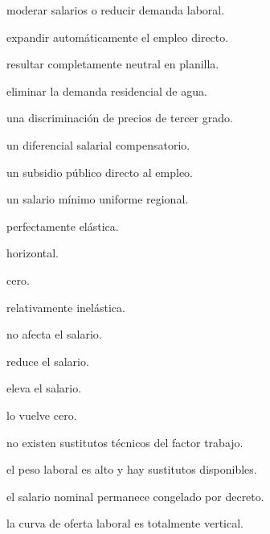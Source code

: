 \begin{opts}
    \item moderar salarios o reducir demanda laboral.
    \item expandir automáticamente el empleo directo.
    \item resultar completamente neutral en planilla.
    \item eliminar la demanda residencial de agua.
\end{opts}

\begin{opts}
    \item una discriminación de precios de tercer grado.
    \item un diferencial salarial compensatorio.
    \item un subsidio público directo al empleo.
    \item un salario mínimo uniforme regional.
\end{opts}

\begin{opts}
    \item perfectamente elástica.
    \item horizontal.
    \item cero.
    \item relativamente inelástica.
\end{opts}

\begin{opts}
    \item no afecta el salario.
    \item reduce el salario.
    \item eleva el salario.
    \item lo vuelve cero.
\end{opts}

\begin{opts}
    \item no existen sustitutos técnicos del factor trabajo.
    \item el peso laboral es alto y hay sustitutos disponibles.
    \item el salario nominal permanece congelado por decreto.
    \item la curva de oferta laboral es totalmente vertical.
\end{opts}

